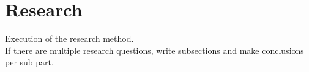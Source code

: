 \documentclass[../main.tex]{subfiles}
\begin{document}
    \section{Research}\label{sec:research}
    Execution of the research method. 
    \\
    If there are multiple research questions, write subsections and make conclusions per sub part.
\end{document}
